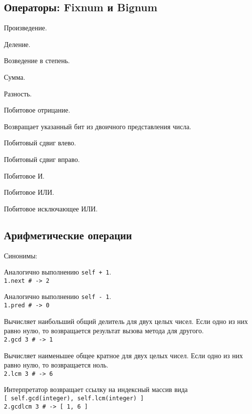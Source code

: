 \subsection*{Операторы: Fixnum и Bignum}

  \begin{methodlist}
  Произведение.

  Деление.

  Возведение в степень.

  Сумма.

  Разность.

  Побитовое отрицание.

  Возвращает указанный бит из двоичного представления числа.

  Побитовый сдвиг влево.

  Побитовый сдвиг вправо.

  Побитовое И.

  Побитовое ИЛИ.

  Побитовое исключающее ИЛИ.
\end{methodlist}

\subsection*{Арифметические операции}

\begin{methodlist}
  Синонимы: 

  Аналогично выполнению \verb!self + 1!.
  \\\verb!1.next # -> 2!

  Аналогично выполнению \verb!self - 1!.
  \\\verb!1.pred # -> 0!

  Вычисляет наибольший общий делитель для двух целых чисел. Если одно из них равно нулю, то возвращается результат вызова метода  для другого.
  \\\verb!2.gcd 3 # -> 1!

  Вычисляет наименьшее общее кратное для двух целых чисел. Если одно из них равно нулю, то возвращается ноль.
  \\\verb!2.lcm 3 # -> 6!

  	Интерпретатор возвращает ссылку на индексный массив вида
  \\\verb![ self.gcd(integer), self.lcm(integer) ]!
  \\\verb!2.gcdlcm 3 # -> [ 1, 6 ]!
\end{methodlist}

